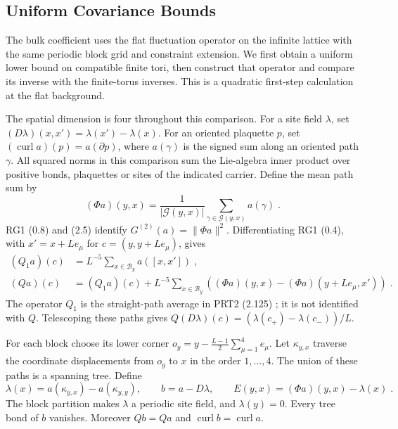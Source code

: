 \documentclass[11pt]{article}
\begin{document}
\subsection{Uniform Covariance Bounds}

The bulk coefficient uses the flat fluctuation operator on the infinite lattice with the same periodic block grid and constraint extension. We first obtain a uniform lower bound on compatible finite tori, then construct that operator and compare its inverse with the finite-torus inverses. This is a quadratic first-step calculation at the flat background.

The spatial dimension is four throughout this comparison. For a site field $\lambda$, set $(D\lambda)(x,x')=\lambda(x')-\lambda(x)$. For an oriented plaquette $p$, set $(\operatorname{curl}a)(p)=a(\partial p)$, where $a(\gamma)$ is the signed sum along an oriented path $\gamma$. All squared norms in this comparison sum the Lie-algebra inner product over positive bonds, plaquettes or sites of the indicated carrier. Define the mean path sum by
\begin{equation}\label{eq:covariance-mean-path}
    (\Phi a)(y,x)=\frac{1}{|\mathcal G(y,x)|}
        \sum_{\gamma\in\mathcal G(y,x)}a(\gamma)\;.
\end{equation}
RG1 (0.8) and (2.5) identify $G^{(2)}(a)=\|\Phi a\|^2$. Differentiating RG1 (0.4), with $x'=x+Le_\mu$ for $c=(y,y+Le_\mu)$, gives
\begin{equation}\label{eq:covariance-two-averages}
    \begin{aligned}
        (Q_1a)(c)&=L^{-5}\sum_{x\in\mathcal B_y}a([x,x'])\;,\\
        (Qa)(c)&=(Q_1a)(c)
            +L^{-5}\sum_{x\in\mathcal B_y}
                ((\Phi a)(y,x)-(\Phi a)(y+Le_\mu,x'))\;.
    \end{aligned}
\end{equation}
The operator $Q_1$ is the straight-path average in PRT2 (2.125) \cite{BalabanPRT2}; it is not identified with $Q$. Telescoping these paths gives $Q(D\lambda)(c)=(\lambda(c_+)-\lambda(c_-))/L$.

For each block choose its lower corner $o_y=y-\frac{L-1}{2}\sum_{\mu=1}^4 e_\mu$. Let $\kappa_{y,x}$ traverse the coordinate displacements from $o_y$ to $x$ in the order $1,\ldots,4$. The union of these paths is a spanning tree. Define
\begin{equation}\label{eq:covariance-tree-gauge}
    \lambda(x)=a(\kappa_{y,x})-a(\kappa_{y,y}),
    \qquad b=a-D\lambda,
    \qquad E(y,x)=(\Phi a)(y,x)-\lambda(x)\;.
\end{equation}
The block partition makes $\lambda$ a periodic site field, and $\lambda(y)=0$. Every tree bond of $b$ vanishes. Moreover $Qb=Qa$ and $\operatorname{curl}b=\operatorname{curl}a$.
\end{document}
